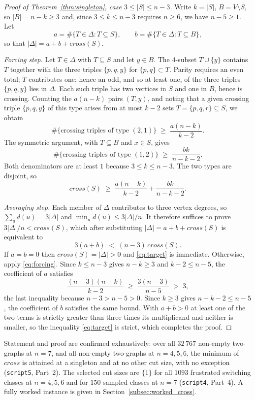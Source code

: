 \documentclass[11pt,a4paper]{article}
\def\mathrm#1{#1}%
\newcommand{\cross}{\mathrm{cross}}
\newcommand{\dtg}{d}
\begin{document}
\begin{proof}[Proof of Theorem~\ref{thm:singleton}, case $3\le|S|\le n-3$]
Write $k=|S|$, $B=V\setminus S$, so $|B|=n-k\ge3$ and, since $3\le k\le n-3$ requires $n\ge6$, we have $n-5\ge1$. Let
\[
a=\#\{T\in\Delta: T\subseteq S\},\qquad b=\#\{T\in\Delta: T\subseteq B\},
\]
so that $|\Delta|=a+b+\cross(S)$.

\emph{Forcing step.} Let $T\in\Delta$ with $T\subseteq S$ and let $y\in B$. The $4$-subset $T\cup\{y\}$ contains $T$ together with the three triples $\{p,q,y\}$ for $\{p,q\}\subset T$. Parity requires an even total; $T$ contributes one; hence an odd, and so at least one, of the three triples $\{p,q,y\}$ lies in $\Delta$. Each such triple has two vertices in $S$ and one in $B$, hence is crossing. Counting the $a(n-k)$ pairs $(T,y)$, and noting that a given crossing triple $\{p,q,y\}$ of this type arises from at most $k-2$ sets $T=\{p,q,r\}\subseteq S$, we obtain
\[
\#\{\text{crossing triples of type } (2,1)\}\;\ge\;\frac{a(n-k)}{k-2}.
\]
The symmetric argument, with $T\subseteq B$ and $x\in S$, gives
\[
\#\{\text{crossing triples of type } (1,2)\}\;\ge\;\frac{bk}{n-k-2}.
\]
Both denominators are at least $1$ because $3\le k\le n-3$. The two types are disjoint, so
\begin{equation}
\cross(S)\;\ge\;\frac{a(n-k)}{k-2}+\frac{bk}{n-k-2}.
\label{eq:forcing}
\end{equation}

\emph{Averaging step.} Each member of $\Delta$ contributes to three vertex degrees, so $\sum_{u}\dtg(u)=3|\Delta|$ and $\min_u\dtg(u)\le3|\Delta|/n$. It therefore suffices to prove $3|\Delta|/n<\cross(S)$, which after substituting $|\Delta|=a+b+\cross(S)$ is equivalent to
\begin{equation}
3(a+b)\;<\;(n-3)\,\cross(S).
\label{eq:target}
\end{equation}
If $a=b=0$ then $\cross(S)=|\Delta|>0$ and \eqref{eq:target} is immediate. Otherwise, apply \eqref{eq:forcing}. Since $k\le n-3$ gives $n-k\ge3$ and $k-2\le n-5$, the coefficient of $a$ satisfies
\[
\frac{(n-3)(n-k)}{k-2}\;\ge\;\frac{3(n-3)}{n-5}\;>\;3,
\]
the last inequality because $n-3>n-5>0$. Since $k\ge3$ gives $n-k-2\le n-5$, the coefficient of $b$ satisfies the same bound. With $a+b>0$ at least one of the two terms is strictly greater than three times its multiplicand and neither is smaller, so the inequality \eqref{eq:target} is strict, which completes the proof.
\end{proof}

Statement and proof are confirmed exhaustively: over all $32\,767$ non-empty two-graphs at $n=7$, and all non-empty two-graphs at $n=4,5,6$, the minimum of $\cross$ is attained at a singleton and at no other cut size, with no exception (\texttt{script5}, Part~2). The selected cut sizes are $\{1\}$ for all $1093$ frustrated switching classes at $n=4,5,6$ and for $150$ sampled classes at $n=7$ (\texttt{script4}, Part~4). A fully worked instance is given in Section~\ref{subsec:worked_cross}.
\end{document}
